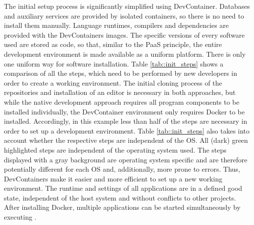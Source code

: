         The initial setup process is significantly simplified using DevContainer. Databases and auxiliary services are provided by isolated containers, so there is no need to install them manually. Language runtimes, compilers and dependencies are provided with the DevContainers images. The specific versions of every software used are stored as code, so that, similar to the \ac{PaaS} principle, the entire development environment is made available as a uniform platform. There is only one uniform way for software installation.\newline
        Table \ref{tab::init_steps} shows a comparison of all the steps, which need to be performed by new developers in order to create a working environment. The initial cloning process of the repositories and installation of an editor is necessary in both approaches, but while the native development approach requires all program components to be installed individually, the DevContainer environment only requires Docker to be installed. Accordingly, in this example less than half of the steps are necessary in order to set up a development environment. Table \ref{tab::init_steps} also takes into account whether the respective steps are independent of the \acl{OS}. All (dark) green highlighted steps are independent of the operating system used. The steps displayed with a gray background are operating system specific and are therefore potentially different for each \ac{OS} and, additionally, more prone to errors.\newline
        Thus, DevContainers make it easier and more efficient to set up a new working environment. The runtime and settings of all applications are in a defined good state, independent of the host system and without conflicts to other projects. After installing Docker, multiple applications can be started simultaneously by executing .
        

